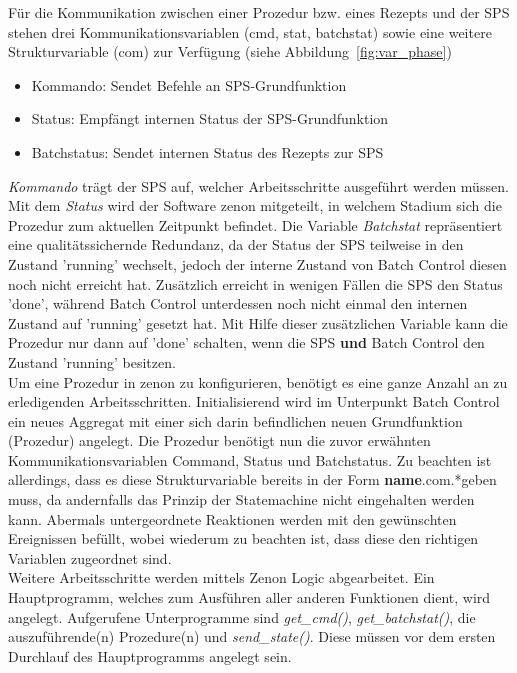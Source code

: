 	Für die Kommunikation zwischen einer Prozedur bzw. eines Rezepts und der \ac{SPS} stehen drei Kommunikationsvariablen (cmd, stat, batchstat) sowie eine weitere Strukturvariable (com) zur Verfügung (siehe Abbildung~\ref{fig:var_phase})
	
	\begin{itemize}
		\item Kommando: Sendet Befehle an \ac{SPS}-Grundfunktion
		\item Status: Empfängt internen Status der \ac{SPS}-Grundfunktion
		\item Batchstatus: Sendet internen Status des Rezepts zur \ac{SPS}
	\end{itemize}

	\textit{Kommando} trägt der \ac{SPS} auf, welcher Arbeitsschritte ausgeführt werden müssen. Mit dem \textit{Status} wird der Software zenon mitgeteilt, in welchem Stadium sich die Prozedur zum aktuellen Zeitpunkt befindet. Die Variable \textit{Batchstat} repräsentiert eine qualitätssichernde Redundanz, da der Status der \ac{SPS} teilweise in den Zustand 'running' wechselt, jedoch der interne Zustand von Batch Control diesen noch nicht erreicht hat. Zusätzlich erreicht in wenigen Fällen die \ac{SPS} den Status 'done', während Batch Control unterdessen noch nicht einmal den internen Zustand auf 'running' gesetzt hat. Mit Hilfe dieser zusätzlichen Variable kann die Prozedur nur dann auf 'done' schalten, wenn die \ac{SPS} \textbf{und} Batch Control den Zustand 'running' besitzen.\\
	
	Um eine Prozedur in zenon zu konfigurieren, benötigt es eine ganze Anzahl an zu erledigenden Arbeitsschritten. Initialisierend wird im Unterpunkt Batch Control ein neues Aggregat mit einer sich darin befindlichen neuen Grundfunktion (Prozedur) angelegt. Die Prozedur benötigt nun die zuvor erwähnten Kommunikationsvariablen Command, Status und Batchstatus. Zu beachten ist allerdings, dass es diese Strukturvariable bereits in der Form \glqq \textbf{name}.com.*\grqq \space geben muss, da andernfalls das Prinzip der Statemachine nicht eingehalten werden kann. Abermals untergeordnete Reaktionen werden mit den gewünschten Ereignissen befüllt, wobei wiederum zu beachten ist, dass diese den richtigen Variablen zugeordnet sind.\\

	Weitere Arbeitsschritte werden mittels Zenon Logic abgearbeitet. Ein Hauptprogramm, welches zum Ausführen aller anderen Funktionen dient, wird angelegt. Aufgerufene Unterprogramme sind \textit{get\_cmd()}, \textit{get\_batchstat()}, die auszuführende(n) Prozedure(n) und \textit{send\_state()}. Diese müssen vor dem ersten Durchlauf des Hauptprogramms angelegt sein.\\
	

